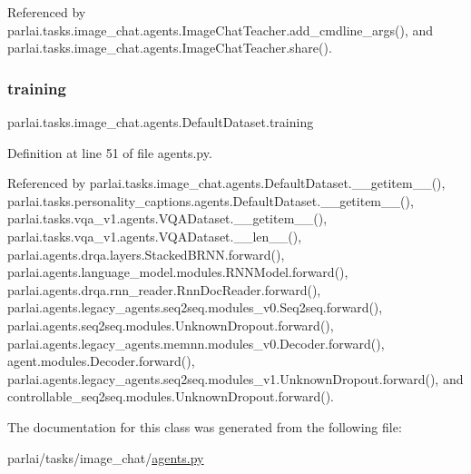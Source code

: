 Referenced by parlai.\+tasks.\+image\+\_\+chat.\+agents.\+Image\+Chat\+Teacher.\+add\+\_\+cmdline\+\_\+args(), and parlai.\+tasks.\+image\+\_\+chat.\+agents.\+Image\+Chat\+Teacher.\+share().

\mbox{\label{classparlai_1_1tasks_1_1image__chat_1_1agents_1_1DefaultDataset_a2419786bfafc52743cd7a551a5bad7d1}} 
\subsubsection{\texorpdfstring{training}{training}}
{\footnotesize\ttfamily parlai.\+tasks.\+image\+\_\+chat.\+agents.\+Default\+Dataset.\+training}



Definition at line 51 of file agents.\+py.



Referenced by parlai.\+tasks.\+image\+\_\+chat.\+agents.\+Default\+Dataset.\+\_\+\+\_\+getitem\+\_\+\+\_\+(), parlai.\+tasks.\+personality\+\_\+captions.\+agents.\+Default\+Dataset.\+\_\+\+\_\+getitem\+\_\+\+\_\+(), parlai.\+tasks.\+vqa\+\_\+v1.\+agents.\+V\+Q\+A\+Dataset.\+\_\+\+\_\+getitem\+\_\+\+\_\+(), parlai.\+tasks.\+vqa\+\_\+v1.\+agents.\+V\+Q\+A\+Dataset.\+\_\+\+\_\+len\+\_\+\+\_\+(), parlai.\+agents.\+drqa.\+layers.\+Stacked\+B\+R\+N\+N.\+forward(), parlai.\+agents.\+language\+\_\+model.\+modules.\+R\+N\+N\+Model.\+forward(), parlai.\+agents.\+drqa.\+rnn\+\_\+reader.\+Rnn\+Doc\+Reader.\+forward(), parlai.\+agents.\+legacy\+\_\+agents.\+seq2seq.\+modules\+\_\+v0.\+Seq2seq.\+forward(), parlai.\+agents.\+seq2seq.\+modules.\+Unknown\+Dropout.\+forward(), parlai.\+agents.\+legacy\+\_\+agents.\+memnn.\+modules\+\_\+v0.\+Decoder.\+forward(), agent.\+modules.\+Decoder.\+forward(), parlai.\+agents.\+legacy\+\_\+agents.\+seq2seq.\+modules\+\_\+v1.\+Unknown\+Dropout.\+forward(), and controllable\+\_\+seq2seq.\+modules.\+Unknown\+Dropout.\+forward().



The documentation for this class was generated from the following file\+:\begin{DoxyCompactItemize}
\item 
parlai/tasks/image\+\_\+chat/\hyperlink{parlai_2tasks_2image__chat_2agents_8py}{agents.\+py}\end{DoxyCompactItemize}
